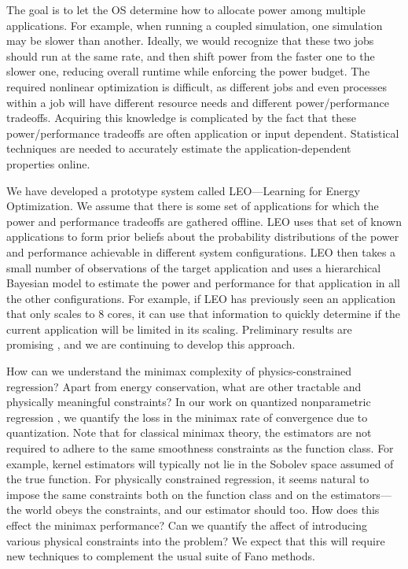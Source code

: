 The goal is to let the OS  determine how to allocate power among
multiple applications. For example, when running a coupled simulation,
one simulation may be slower than another. Ideally, we would recognize
that these two jobs should run at the same rate, and then shift power
from the faster one to the slower one, reducing overall runtime while
enforcing the power budget.  The required nonlinear optimization is
difficult, as different jobs and even processes within a job will have
different resource needs and different power/performance tradeoffs.
Acquiring this knowledge is complicated by the fact that these
power/performance tradeoffs are often application or input
dependent. Statistical techniques are needed to 
accurately estimate the application-dependent properties online.

We have developed a prototype system called LEO---Learning for Energy
Optimization.  We assume that there is some set of
applications for which the power and performance tradeoffs are
gathered offline. LEO uses that set of known applications to form
prior beliefs about the probability distributions of the power and
performance achievable in different system configurations.  LEO then
takes a small number of observations of the target application and
uses a hierarchical Bayesian model to estimate the power and
performance for that application in all the other configurations. 
For example, if
LEO has previously seen an application that only scales to 8 cores, it
can use that information to quickly determine if the current
application will be limited in its scaling.  
Preliminary results
are promising \citep{nik:14}, and we are continuing to develop
this approach.


How can we understand the minimax complexity of physics-constrained
regression? Apart from energy conservation, what are other tractable and physically meaningful constraints?
In our work on quantized nonparametric regression \citep{qnm}, we
quantify
the loss in the minimax rate of convergence due to quantization.  Note
that for classical minimax theory, the estimators are not required to
adhere to the same smoothness constraints as the function class.  For
example, kernel estimators will typically not lie in the Sobolev space
assumed of the true function.  For
physically constrained regression, it seems natural to impose
the same constraints both on the function class and on the
estimators---the world obeys the constraints, and our estimator should
too.  How does this effect the minimax performance?  Can we quantify
the affect of introducing various physical constraints into the
problem? We expect that this will require new techniques to 
complement the usual suite of Fano methods.

